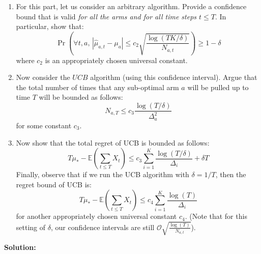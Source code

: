 \documentclass{article}
\newcommand{\solution}{\textbf{\vskip 0.2cm \large Solution:\\}}
\newcommand{\E}[1]{\mathbb{E}\left(#1\right)}
\begin{document}
\begin{enumerate}
	\item For this part, let us consider an arbitrary algorithm. Provide a confidence bound that is valid \emph{for all the arms and for all time steps $t\leq T$}. In particular, show that:
	\[
		\Pr\left( \forall t,a, \, | \hat \mu_{a,t} - \mu_a | \leq c_2 \sqrt{\frac{\log(TK/\delta)}{N_{a,t}}} \right)\geq 1-\delta
	\]
	where $c_2$ is an appropriately chosen universal constant.

	\item  Now consider the $UCB$ algorithm (using this confidence interval). Argue that the total number of times that any sub-optimal arm $a$ will be pulled up to time $T$ will be bounded as follows:
	\[
		N_{a,T} \leq c_3 \frac{\log(T/\delta)}{\Delta_a^2} 
	\]
	for some constant $c_3$.

	\item Now show that the total regret of UCB is bounded as follows: 
	\[
		T \mu_* - \E{\sum_{t\leq T} X_t}   \leq c_3 \sum_{i=1}^K\frac{\log(T/\delta)}{\Delta_i} + \delta T
	\]
	Finally, observe that if we run the UCB algorithm with $\delta=1/T$, then the regret bound of UCB is:
	\[
		T \mu_* - \E{\sum_{t\leq T} X_t}   \leq c_4 \sum_{i=1}^K\frac{\log(T)}{\Delta_i}
	\]
	for another appropriately chosen universal constant $c_4$. (Note that for this setting of $\delta$, our confidence intervals are still $\mathcal{O} \sqrt{\frac{\log(T)}{N_{a,t}}}$).
\end{enumerate}

\newpage

\solution
\end{document}
